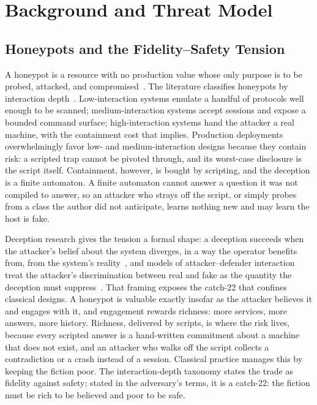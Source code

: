 \section{Background and Threat Model}
\label{sec:background}

\subsection{Honeypots and the Fidelity--Safety Tension}
\label{sec:tension}
A honeypot is a resource with no production value whose only purpose is to
be probed, attacked, and compromised~\cite{spitzner2002}. The literature
classifies honeypots by interaction depth~\cite{lopez2024}. Low-interaction
systems emulate a handful of protocols well enough to be scanned;
medium-interaction systems accept sessions and expose a bounded command
surface; high-interaction systems hand the attacker a real machine, with
the containment cost that implies. Production deployments overwhelmingly
favor low- and medium-interaction designs because they contain risk:
a scripted trap cannot be pivoted through, and its worst-case disclosure
is the script itself. Containment, however, is bought by scripting, and
the deception is a finite automaton. A finite automaton cannot answer a
question it was not compiled to answer, so an attacker who strays off the
script, or simply probes from a class the author did not anticipate,
learns nothing new and may learn the host is fake.

Deception research gives the tension a formal shape: a deception succeeds
when the attacker's belief about the system diverges, in a way the
operator benefits from, from the system's reality~\cite{bera2024}, and
models of attacker--defender interaction treat the attacker's
discrimination between real and fake as the quantity the deception must
suppress~\cite{shinde2020,liska2024}. That framing exposes the catch-22
that confines classical designs. A honeypot is valuable exactly insofar
as the attacker believes it and engages with it, and engagement rewards
richness: more services, more answers, more history. Richness, delivered
by scripts, is where the risk lives, because every scripted answer is a
hand-written commitment about a machine that does not exist, and an
attacker who walks off the script collects a contradiction or a crash
instead of a session. Classical practice manages this by keeping the
fiction poor. The interaction-depth taxonomy states the trade as
fidelity against safety; stated in the adversary's terms, it is a
catch-22: the fiction must be rich to be believed and poor to be safe.

